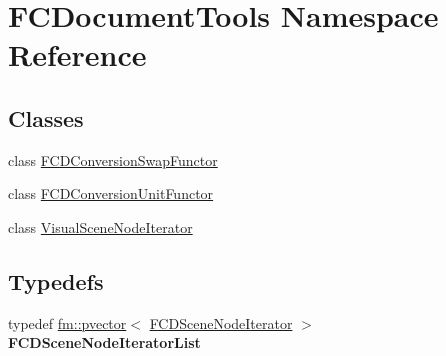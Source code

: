 \hypertarget{namespaceFCDocumentTools}{
\section{FCDocumentTools Namespace Reference}
\label{namespaceFCDocumentTools}
}
\subsection*{Classes}
\begin{DoxyCompactItemize}
\item 
class \hyperlink{classFCDocumentTools_1_1FCDConversionSwapFunctor}{FCDConversionSwapFunctor}
\item 
class \hyperlink{classFCDocumentTools_1_1FCDConversionUnitFunctor}{FCDConversionUnitFunctor}
\item 
class \hyperlink{classFCDocumentTools_1_1VisualSceneNodeIterator}{VisualSceneNodeIterator}
\end{DoxyCompactItemize}
\subsection*{Typedefs}
\begin{DoxyCompactItemize}
\item 
\hypertarget{namespaceFCDocumentTools_ade2a8b1ea2575945bed961f23189568a}{
typedef \hyperlink{classfm_1_1pvector}{fm::pvector}$<$ \hyperlink{classFCDSceneNodeIteratorT}{FCDSceneNodeIterator} $>$ {\bfseries FCDSceneNodeIteratorList}}
\label{namespaceFCDocumentTools_ade2a8b1ea2575945bed961f23189568a}

\end{DoxyCompactItemize}
